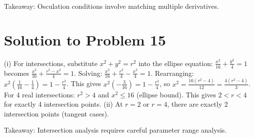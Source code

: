 Takeaway: Osculation conditions involve matching multiple derivatives.

\section*{Solution to Problem 15}
(i) For intersections, substitute $x^2 + y^2 = r^2$ into the ellipse equation:
$\frac{x^2}{16} + \frac{y^2}{4} = 1$ becomes $\frac{x^2}{16} + \frac{r^2-x^2}{4} = 1$.
Solving: $\frac{x^2}{16} + \frac{r^2}{4} - \frac{x^2}{4} = 1$.
Rearranging: $x^2(\frac{1}{16} - \frac{1}{4}) = 1 - \frac{r^2}{4}$.
This gives $x^2(-\frac{3}{16}) = 1 - \frac{r^2}{4}$, so $x^2 = \frac{16(r^2-4)}{12} = \frac{4(r^2-4)}{3}$.
For 4 real intersections: $r^2 > 4$ and $x^2 \leq 16$ (ellipse bound).
This gives $2 < r < 4$ for exactly 4 intersection points.
(ii) At $r = 2$ or $r = 4$, there are exactly 2 intersection points (tangent cases).

Takeaway: Intersection analysis requires careful parameter range analysis.
